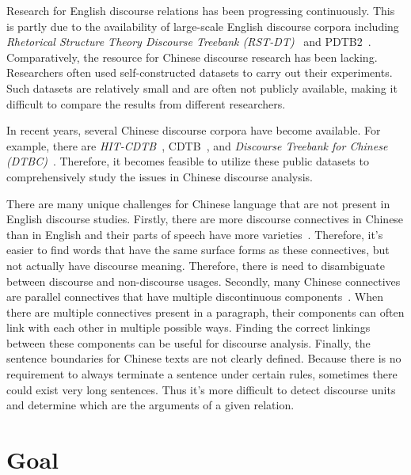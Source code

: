 Research for English discourse relations has been progressing continuously. This is
partly due to the availability of large-scale English discourse corpora including
\textit{Rhetorical Structure Theory Discourse Treebank (RST-DT)}~\citep{Carlson01building}
and PDTB2~\citep{Prasad08thepenn}. Comparatively, the resource for Chinese discourse
research has been lacking. Researchers often used self-constructed datasets to carry
out their experiments. Such datasets are relatively small and are often not publicly
available, making it difficult to compare the results from different researchers.

In recent years, several Chinese discourse corpora have become available. For example,
there are \textit{HIT-CDTB}~\citep{zhang2014chinese}, CDTB~\citep{li2014building}, and
\textit{Discourse Treebank for Chinese (DTBC)}~\citep{zhou2014the}. Therefore, it
becomes feasible to utilize these public datasets to comprehensively study
the issues in Chinese discourse analysis.

There are many unique challenges for Chinese language that are not present in
English discourse studies. Firstly, there are more discourse connectives
in Chinese than in English and their parts of speech have more
varieties~\citep{huang2014interpretation}. Therefore, it's easier to find words
that have the same surface forms as these connectives, but not actually have
discourse meaning. Therefore, there is need to disambiguate between
discourse and non-discourse usages.
Secondly, many Chinese connectives are parallel connectives that
have multiple discontinuous components~\citep{zhou2012pdtb}.
When there are multiple connectives present in a paragraph, their components
can often link with each other in multiple possible ways.
Finding the correct linkings between these components
can be useful for discourse analysis. Finally, the sentence boundaries for
Chinese texts are not clearly defined. Because there is no
requirement to always terminate a sentence under certain rules,
sometimes there could exist very long sentences. Thus it's more difficult
to detect discourse units and determine which are the arguments of a given relation.

%
%
\section{Goal}


